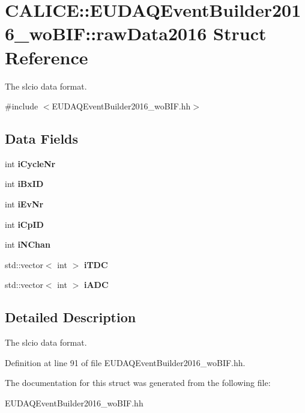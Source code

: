 \section{CALICE::EUDAQEventBuilder2016\_\-woBIF::rawData2016 Struct Reference}
\label{structCALICE_1_1EUDAQEventBuilder2016__woBIF_1_1rawData2016}


The slcio data format.  


{\ttfamily \#include $<$EUDAQEventBuilder2016\_\-woBIF.hh$>$}\subsection*{Data Fields}
\begin{DoxyCompactItemize}
\item 
int {\bfseries iCycleNr}\label{structCALICE_1_1EUDAQEventBuilder2016__woBIF_1_1rawData2016_a60345bf308d7a9c2aea61058bbcae186}

\item 
int {\bfseries iBxID}\label{structCALICE_1_1EUDAQEventBuilder2016__woBIF_1_1rawData2016_a3b0a013af57afc6c66d51544912accdd}

\item 
int {\bfseries iEvNr}\label{structCALICE_1_1EUDAQEventBuilder2016__woBIF_1_1rawData2016_acaf440a212bc84243d58377081b964bd}

\item 
int {\bfseries iCpID}\label{structCALICE_1_1EUDAQEventBuilder2016__woBIF_1_1rawData2016_ae22ff69e72deb92b788c4f92a74fa9cd}

\item 
int {\bfseries iNChan}\label{structCALICE_1_1EUDAQEventBuilder2016__woBIF_1_1rawData2016_afd98d07285d886e0659297eb7b6679cf}

\item 
std::vector$<$ int $>$ {\bfseries iTDC}\label{structCALICE_1_1EUDAQEventBuilder2016__woBIF_1_1rawData2016_aeee048eee49339800053b4b30f363486}

\item 
std::vector$<$ int $>$ {\bfseries iADC}\label{structCALICE_1_1EUDAQEventBuilder2016__woBIF_1_1rawData2016_a2d70d493fb1d0ce9cec3a3f5679e4c42}

\end{DoxyCompactItemize}


\subsection{Detailed Description}
The slcio data format. 

Definition at line 91 of file EUDAQEventBuilder2016\_\-woBIF.hh.

The documentation for this struct was generated from the following file:\begin{DoxyCompactItemize}
\item 
EUDAQEventBuilder2016\_\-woBIF.hh\end{DoxyCompactItemize}
